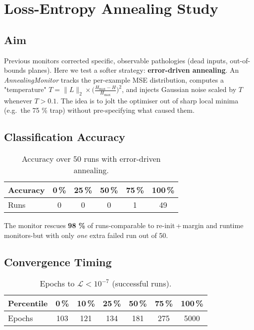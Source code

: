 \section{Loss-Entropy Annealing Study}
\label{sec:relu1-annealing}

\subsection*{Aim}
Previous monitors corrected specific, observable pathologies (dead inputs,
out-of-bounds planes).  
Here we test a softer strategy: \textbf{error-driven annealing}.
An \emph{AnnealingMonitor} tracks the per-example MSE distribution,
computes a "temperature"
\(T = \lVert\!L\!\rVert_2 \times \bigl(\!\tfrac{H_{\max}-H}{H_{\max}}\bigr)^2\),
and injects Gaussian noise scaled by \(T\) whenever
\(T > 0.1\).
The idea is to jolt the optimiser out of sharp local minima
(e.g.\ the 75 \% trap) without pre-specifying what caused them.

\subsection*{Classification Accuracy}

\begin{table}[h]
\centering
\caption{Accuracy over 50 runs with error-driven annealing.}
\label{tab:relu1-anneal-accuracy}
\begin{tabular}{lccccc}
\toprule
Accuracy & 0\,\% & 25\,\% & 50\,\% & 75\,\% & 100\,\% \\
\midrule
Runs & 0 & 0 & 0 & 1 & 49 \\
\bottomrule
\end{tabular}
\end{table}

The monitor rescues \textbf{98 \%} of runs-comparable to
re-init\,+\,margin and runtime monitors-but with only \emph{one} extra
failed run out of 50.

\subsection*{Convergence Timing}

\begin{table}[h]
\centering
\caption{Epochs to $\mathcal L<10^{-7}$ (successful runs).}
\label{tab:relu1-anneal-epochs}
\begin{tabular}{lcccccc}
\toprule
Percentile & 0\,\% & 10\,\% & 25\,\% & 50\,\% & 75\,\% & 100\,\% \\ \midrule
Epochs & 103 & 121 & 134 & 181 & 275 & 5000 \\
\bottomrule
\end{tabular}
\end{table}

